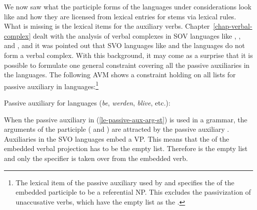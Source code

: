 We now saw what the participle forms of the languages under considerations look like and how they are
licensed from lexical entries for stems via lexical rules. What is missing is the lexical items for
the auxiliary verbs. Chapter~\ref{chap-verbal-complex} dealt with the analysis of verbal complexes in SOV languages like
, , and , and it was pointed out that SVO languages like  and the
 languages do not form a verbal complex. With this background, it may come as a surprise
that it is possible to formulate one general constraint covering all the passive auxiliaries in the
 languages. The following AVM shows a constraint holding on all \argst lists for passive
auxiliary in  languages:\footnote{%
The lexical item of the passive auxiliary used by \citet[]{Mueller2002b} and \citet[]{MOe2013a}
specifies the \dav of the embedded participle to be a referential NP. This excludes the
passivization of unaccusative verbs, which have the empty list as the \dav.
}
 
\ea
\label{le-passive-aux-arg-st}
Passive auxiliary for  languages (\emph{be}, \emph{werden}, \emph{blive}, etc.):\\
\z
%

\noindent
When the passive auxiliary in (\ref{le-passive-aux-arg-st}) is used in a  grammar, the
arguments of the participle ( and ) are attracted by the passive auxiliary
\citep{HN89a,HN94a}. 
Auxiliaries in the SVO languages embed a VP. This means that the \compsv of the embedded verbal
projection has to be the empty list. Therefore  is the empty list and only the specifier  is taken
over from the embedded verb. 

